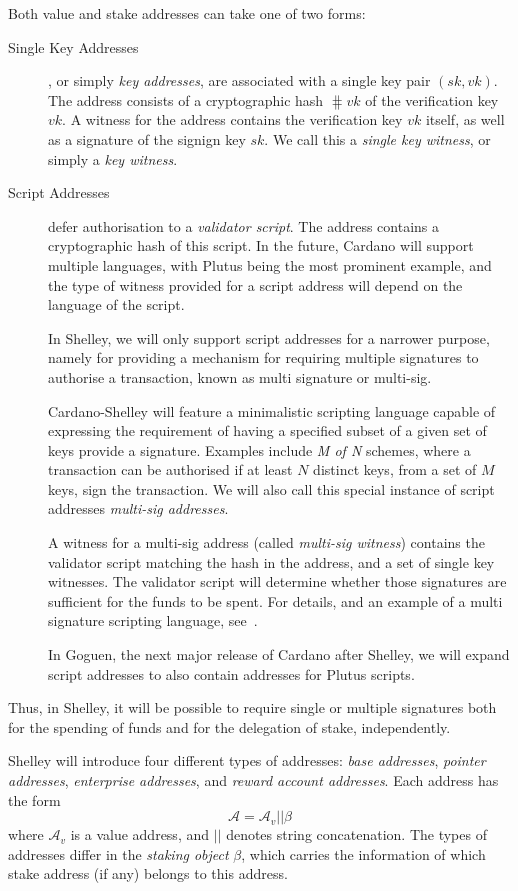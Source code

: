 \documentclass[11pt,a4paper]{article}
\begin{document}
Both value and stake addresses can take one of two forms:
\begin{description}
\item[Single Key Addresses], or simply \emph{key addresses}, are associated with
  a single key pair \((sk, vk)\). The address consists of a cryptographic hash
  \(\hash{vk}\) of the verification key \(vk\). A witness for the address
  contains the verification key \(vk\) itself, as well as a signature of the
  signign key \(sk\). We call this a \emph{single key witness}, or simply a
  \emph{key witness}.

\item[Script Addresses] defer authorisation to a \emph{validator script}. The
  address contains a cryptographic hash of this script. In the future, Cardano
  will support multiple languages, with Plutus being the most prominent example,
  and the type of witness provided for a script address will depend on the
  language of the script.

  In Shelley, we will only support script addresses for a narrower purpose,
  namely for providing a mechanism for requiring multiple signatures to
  authorise a transaction, known as multi signature or multi-sig.

  Cardano-Shelley will feature a minimalistic scripting language capable of
  expressing the requirement of having a specified subset of a given set of keys
  provide a signature. Examples include \emph{M of N} schemes, where a
  transaction can be authorised if at least \(N\) distinct keys, from a set of
  \(M\) keys, sign the transaction. We will also call this special instance of
  script addresses \emph{multi-sig addresses}.

  A witness for a multi-sig address (called \emph{multi-sig witness}) contains
  the validator script matching the hash in the address, and a set of single key
  witnesses. The validator script will determine whether those signatures are
  sufficient for the funds to be spent. For details, and an example of a multi
  signature scripting language, see~\citep{multi-sig-scripts}.

  In Goguen, the next major release of Cardano after Shelley, we will expand
  script addresses to also contain addresses for Plutus scripts.
\end{description}
Thus, in Shelley, it will be possible to require single or multiple signatures
both for the spending of funds and for the delegation of stake, independently.

Shelley will introduce four different types of addresses: \emph{base
addresses}, \emph{pointer addresses}, \emph{enterprise addresses}, and
\emph{reward account addresses}. Each address has the form
\begin{equation}
\mathcal{A} = \mathcal{A}_v \mathbin{||} \beta
\label{eq:address-general}
\end{equation}
where \(\mathcal{A}_v\) is a value address, and \(||\) denotes string
concatenation. The types of addresses differ in the \emph{staking object}
\(\beta\), which carries the information of which stake address (if any) belongs
to this address.
\end{document}
